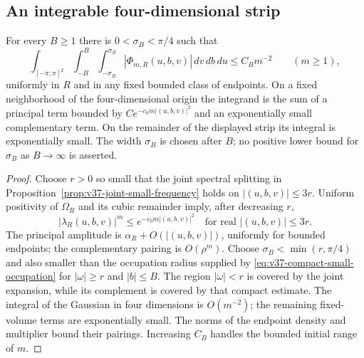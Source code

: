 \subsection{An integrable four-dimensional strip}
\begin{proposition}
\label{prop:v38-strip-integral}
For every $B\ge1$ there is $0<\sigma_B<\pi/4$ such that
\begin{equation}\label{eq:v38-strip-integral}
 \int_{[-\pi,\pi]^2}\int_{-B}^{B}\int_{-\sigma_B}^{\sigma_B}
          |\Phi_{m,R}(u,b,v)|\,dv\,db\,du\le C_Bm^{-2}
 \qquad(m\ge1),
\end{equation}
uniformly in $R$ and in any fixed bounded class of endpoints.
On a fixed neighborhood of the four-dimensional origin the integrand
is the sum of a principal term bounded by $C e^{-c_0m|(u,b,v)|^2}$
and an exponentially small complementary term. On the remainder of
the displayed strip its integral is exponentially small.
The width $\sigma_B$ is chosen after $B$; no positive lower bound for
$\sigma_B$ as $B\to\infty$ is asserted.
\end{proposition}
\begin{proof}
Choose $r>0$ so small that the joint spectral splitting in
Proposition~\ref{prop:v37-joint-small-frequency} holds on
$|(u,b,v)|\le3r$. Uniform positivity of $\Omega_R$ and its cubic
remainder imply, after decreasing $r$,
\[
 |\lambda_R(u,b,v)|^m\le e^{-c_0m|(u,b,v)|^2}
 \quad\text{for real }|(u,b,v)|\le3r.
\]
The principal amplitude is $\alpha_R+O(|(u,b,v)|)$, uniformly for
bounded endpoints; the complementary pairing is $O(\rho^m)$.
Choose $\sigma_B<\min(r,\pi/4)$ and also smaller than the occupation
radius supplied by \eqref{eq:v37-compact-small-occupation} for
$|\omega|\ge r$ and $|b|\le B$. The region $|\omega|<r$ is covered
by the joint expansion, while its complement is covered by that
compact estimate. The integral of the Gaussian in four dimensions is
$O(m^{-2})$; the remaining fixed-volume terms are exponentially small.
The norms of the endpoint density and multiplier bound their pairings.
Increasing $C_B$ handles the bounded initial range of $m$.
\end{proof}

